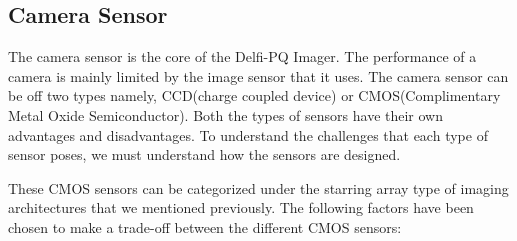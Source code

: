\subsection{Camera Sensor}
The camera sensor is the core of the Delfi-PQ Imager. The performance of a camera is mainly limited by the image sensor that it uses\cite{cmos}. The camera sensor can be off two types namely, CCD(charge coupled device) or CMOS(Complimentary Metal Oxide Semiconductor). Both the types of sensors have their own advantages and disadvantages. To understand the challenges that each type of sensor poses, we must understand how the sensors are designed.

These CMOS sensors can be categorized under the starring array type of imaging architectures that we mentioned previously. The following factors have been chosen to  make a trade-off between the different CMOS sensors:
